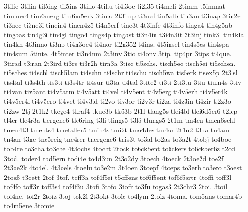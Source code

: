 {    3tilie
    3tilin
    til5ing
    til5ins
    3tillo
    4tillu
    ti4l3oe
    ti2l3ö
    ti4meli
    2timm
    t5immat
    timmer4
    tim6merg
    tim6m5erk
    3timo
    2t3imp
    ti3naf
    tin5alb
    tin3an
    ti3nap
    3tin2e
    ti3nec
    ti3ne3i
    tinein4
    tinen4z5
    ti4n5erf
    tine3t
    4t3infe
    4t3info
    tinga4
    tin4g5ab
    ting5as
    tin4g3i
    tin4gl
    tingo4
    tings4p
    ting5st
    ti3n4in
    t3i4n3it
    2t3inj
    tink3l
    tin4kla
    tin4kn
    4t3inno
    ti3no
    ti4n3oe4
    ti4nor
    ti2n3ö2
    t4ins.
    4t5insel
    tin4s5es
    tin4spa
    tin4sum
    5tinte.
    4t5inter
    ti3n4um
    2t3inv
    3tio
    ti4onv
    3tip.
    tip4pr
    3tips
    ti4que.
    3tirad
    t3iran
    2t3ird
    ti3re
    ti3r2h
    tirn3a
    3tisc
    ti5sche.
    tisch5ec
    tisch5ei
    ti5schen.
    ti5sches
    ti4schl
    tisch5lam
    ti4schn
    ti4schr
    ti4schu
    tisch5wa
    tis5erk
    tisex5p
    2t3isl
    tis4tal
    ti3s4th
    tis3ti
    ti3s4tr
    ti4sur
    ti3ta
    ti4tal
    3tite2
    ti3ti
    2ti3tu
    3tiu
    tium4s
    3tiv
    ti4van
    tiv5ant
    ti4v5atm
    ti4v5att
    ti4vel
    ti4v5ent
    ti4v5erg
    ti4v5erh
    ti4v5er4k
    ti4v5er4l
    ti4v5ero
    ti4vet
    ti4v3id
    ti2vo
    tiv3or
    ti2v3r
    ti2za
    ti4z3in
    ti4zir
    ti2z3o
    ti2zw
    2tj
    2t1k2
    tkege4
    tkraf4
    tkue3b
    tkü3b
    2t1l
    tlang5s
    tlei4bl
    tlei6d5er6
    t2lep
    tl4er
    tle4r3a
    tlergene6
    tle6ring
    t3li
    tlings5
    t3lö
    tlungs5
    2t1m
    tm4en
    tmen6schl
    tmen4t3
    tments4
    tmetaller5
    tmin4s
    tmi2t
    tmo4des
    tm4or
    2t1n2
    t3na
    tn4am
    tn4an
    t3ne
    tne5reig
    tne4rer
    tnergene6
    tnis3t
    to3al
    to2as
    to3a2t
    4tobj
    to4boe
    tob4re
    to3cha
    to3che
    4t3ochs
    3tocht
    2tock
    to6ck5ent
    to6ckers
    to6ck5er6z
    t2od
    3tod.
    toder4
    tod5ern
    todi4e
    to4d3un
    2t3o2dy
    3toech
    4toeck
    2t3oe2d
    toe2f
    2t3oe2k
    4to4el.
    4t3oels
    4toelu
    to3e2m
    3t4oen
    3toepf
    4toeps
    to3erh
    to3ero
    t3oest
    2toeß
    t3oett
    2tof
    3tof.
    toff3a
    tof4f5ei
    t5offens
    tof6f5ent
    tof6f5ertr
    4toffi
    toff3l
    tof4fo
    toff3r
    toff3s4
    tof4f3u
    3tofi
    3tofo
    3tofr
    to3fu
    togas3
    2t3ohr3
    2toi.
    3toil
    toi4ne.
    toi2r
    2toiz
    3toj
    tok2l
    2t3okt
    3tole
    to4lym
    2tolz
    4toma.
    tom5ans
    tomar4b
    to4m5ene
    3tomie
}
